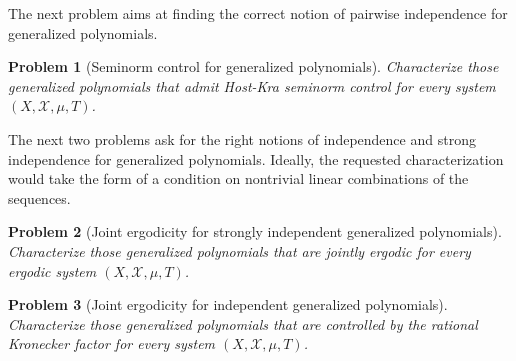 \documentclass[11pt]{amsart}
\newtheorem{problem}{Problem}
\theoremstyle{definition}
\newcommand{\CX}{{\mathcal X}}
\newcommand{\1}{{\mathbf{1}}}
\begin{document}
    The next problem aims at finding the correct notion of pairwise independence for generalized polynomials.
    \begin{problem}[Seminorm control for generalized polynomials] %
        Characterize those generalized polynomials that admit Host-Kra seminorm control for every system $(X, \CX, \mu, T)$.
    \end{problem}
    The next two problems ask for the right notions of independence and strong independence for generalized polynomials. Ideally, the requested characterization would take the form of a condition on nontrivial linear combinations of the sequences.
    \begin{problem}[Joint ergodicity for strongly independent generalized polynomials] %
        Characterize those generalized polynomials that are jointly ergodic for every ergodic system $(X, \CX, \mu, T)$.
    \end{problem}
     \begin{problem}[Joint ergodicity for independent generalized polynomials] %
        Characterize those generalized polynomials that are controlled by the rational Kronecker factor for every system $(X, \CX, \mu, T)$.
    \end{problem}
\end{document}
